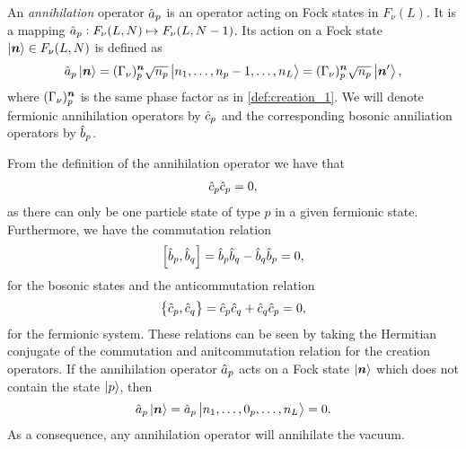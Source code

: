             \begin{definition}
                \label{def:annihilation_1}
                An \emph{annihilation} operator $\hat{a}_{p}$ is an operator acting
                on Fock states in $F_{\nu}(L)$.
                It is a mapping $\hat{a}_{p}: F_{\nu}(L, N) \mapsto F_{\nu}(L, N -
                1)$.
                Its action on a Fock state $\ket{\boldsymbol{n}} \in F_{\nu}(L, N)$ is
                defined as
                \begin{align}
                    \hat{a}_{p}\ket{\boldsymbol{n}}
                    = (\Gamma_{\nu})^{\boldsymbol{n}}_{p}
                    \sqrt{n_p}
                    \ket{n_1, \dots, n_p - 1, \dots, n_L}
                    = (\Gamma_{\nu})^{\boldsymbol{n}}_{p}
                    \sqrt{n_p}
                    \ket{\boldsymbol{n}'},
                \end{align}
                where $(\Gamma_{\nu})^{\boldsymbol{n}}_{p}$ is the same phase factor as
                in \autoref{def:creation_1}.
                We will denote fermionic annihilation operators by $\hat{c}_{p}$ and
                the corresponding bosonic anniliation operators by $\hat{b}_{p}$.
            \end{definition}
            From the definition of the annihilation operator we have that
            \begin{align}
                \hat{c}_{p}\hat{c}_{p} = 0,
            \end{align}
            as there can only be one particle state of type $p$ in a given
            fermionic state.
            Furthermore, we have the commutation relation
            \begin{align}
                \left[\hat{b}_{p}, \hat{b}_{q}\right] = \hat{b}_{p}\hat{b}_{q} - \hat{b}_{q}\hat{b}_{p} = 0,
            \end{align}
            for the bosonic states and the anticommutation relation
            \begin{align}
                \left\{\hat{c}_{p}, \hat{c}_{q}\right\} = \hat{c}_{p}\hat{c}_{q} + \hat{c}_{q}\hat{c}_{p} = 0,
            \end{align}
            for the fermionic system.
            These relations can be seen by taking the Hermitian conjugate of the
            commutation and anitcommutation relation for the creation operators.
            If the annihilation operator $\hat{a}_{p}$ acts on a Fock state
            $\ket{\boldsymbol{n}}$ which does not contain the state $\ket{p}$, then
            \begin{align}
                \hat{a}_{p}\ket{\boldsymbol{n}}
                = \hat{a}_{p}\ket{n_1, \dots, 0_p, \dots, n_L}
                = 0.
            \end{align}
            As a consequence, any annihilation operator will annihilate the
            vacuum.

